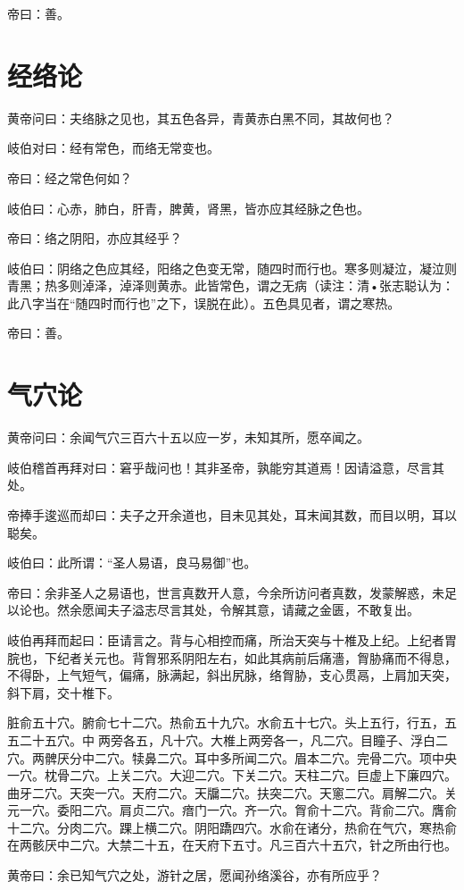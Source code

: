 \documentclass{article}%
\begin{document}
帝曰：善。
\section{经络论}
黄帝问曰：夫络脉之见也，其五色各异，青黄赤白黑不同，其故何也？

岐伯对曰：经有常色，而络无常变也。

帝曰：经之常色何如？

岐伯曰：心赤，肺白，肝青，脾黄，肾黑，皆亦应其经脉之色也。

帝曰：络之阴阳，亦应其经乎？

岐伯曰：阴络之色应其经，阳络之色变无常，随四时而行也。寒多则凝泣，凝泣则青黑；热多则淖泽，淖泽则黄赤。此皆常色，谓之无病（读注：清•张志聪认为：此八字当在“随四时而行也”之下，误脱在此）。五色具见者，谓之寒热。

帝曰：善。
\section{气穴论}
黄帝问曰：余闻气穴三百六十五以应一岁，未知其所，愿卒闻之。

岐伯稽首再拜对曰：窘乎哉问也！其非圣帝，孰能穷其道焉！因请溢意，尽言其处。

帝捧手逡巡而却曰：夫子之开余道也，目未见其处，耳末闻其数，而目以明，耳以聪矣。

岐伯曰：此所谓：“圣人易语，良马易御”也。

帝曰：余非圣人之易语也，世言真数开人意，今余所访问者真数，发蒙解惑，未足以论也。然余愿闻夫子溢志尽言其处，令解其意，请藏之金匮，不敢复出。

岐伯再拜而起曰：臣请言之。背与心相控而痛，所治天突与十椎及上纪。上纪者胃脘也，下纪者关元也。背胷邪系阴阳左右，如此其病前后痛濇，胷胁痛而不得息，不得卧，上气短气，偏痛，脉满起，斜出尻脉，络胷胁，支心贯鬲，上肩加天突，斜下肩，交十椎下。

脏俞五十穴。腑俞七十二穴。热俞五十九穴。水俞五十七穴。头上五行，行五，五五二十五穴。中𦛗两旁各五，凡十穴。大椎上两旁各一，凡二穴。目瞳子、浮白二穴。两髀厌分中二穴。犊鼻二穴。耳中多所闻二穴。眉本二穴。完骨二穴。项中央一穴。枕骨二穴。上关二穴。大迎二穴。下关二穴。天柱二穴。巨虚上下廉四穴。曲牙二穴。天突一穴。天府二穴。天牖二穴。扶突二穴。天窻二穴。肩解二穴。关元一穴。委阳二穴。肩贞二穴。瘖门一穴。齐一穴。胷俞十二穴。背俞二穴。膺俞十二穴。分肉二穴。踝上横二穴。阴阳蹻四穴。水俞在诸分，热俞在气穴，寒热俞在两骸厌中二穴。大禁二十五，在天府下五寸。凡三百六十五穴，针之所由行也。

黄帝曰：余已知气穴之处，游针之居，愿闻孙络溪谷，亦有所应乎？
\end{document}
